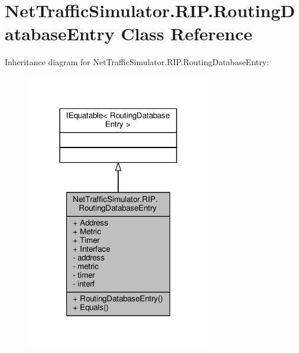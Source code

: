 \hypertarget{classNetTrafficSimulator_1_1RIP_1_1RoutingDatabaseEntry}{\section{Net\-Traffic\-Simulator.\-R\-I\-P.\-Routing\-Database\-Entry Class Reference}
\label{classNetTrafficSimulator_1_1RIP_1_1RoutingDatabaseEntry}
}


Inheritance diagram for Net\-Traffic\-Simulator.\-R\-I\-P.\-Routing\-Database\-Entry\-:\nopagebreak
\begin{figure}[H]
\begin{center}
\leavevmode
\includegraphics[width=228pt]{classNetTrafficSimulator_1_1RIP_1_1RoutingDatabaseEntry__inherit__graph}
\end{center}
\end{figure}


